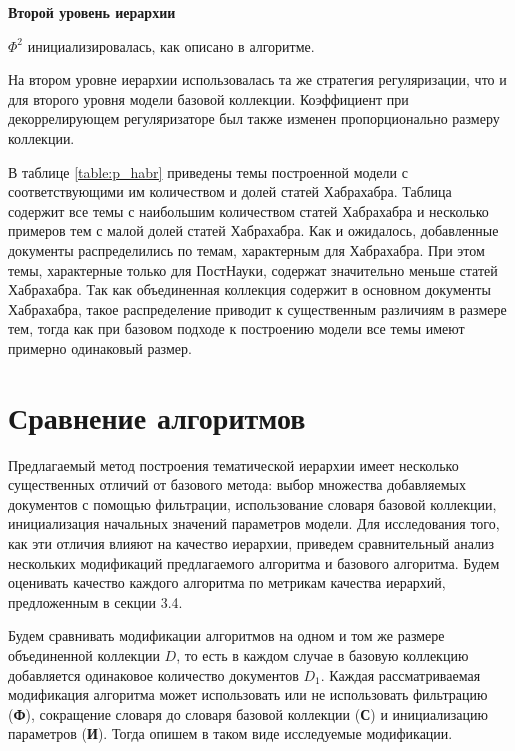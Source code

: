 \textbf{Второй уровень иерархии} 

$\Phi^2$ инициализировалась, как описано в алгоритме.

На втором уровне иерархии использовалась та же стратегия регуляризации, что и для второго уровня модели базовой коллекции. Коэффициент при декоррелирующем регуляризаторе был также изменен пропорционально размеру коллекции. 

В таблице \ref{table:p_habr} приведены темы построенной модели с соответствующими им количеством и долей статей Хабрахабра. Таблица содержит все темы с наибольшим количеством статей Хабрахабра и несколько примеров тем с малой долей статей Хабрахабра. Как и ожидалось, добавленные документы распределились по темам, характерным для Хабрахабра. При этом темы, характерные только для ПостНауки, содержат значительно меньше статей Хабрахабра. Так как объединенная коллекция содержит в основном документы Хабрахабра, такое распределение приводит к существенным различиям в размере тем, тогда как при базовом подходе к построению модели все темы имеют примерно одинаковый размер.

\section{Сравнение алгоритмов}

Предлагаемый метод построения тематической иерархии имеет несколько существенных отличий от базового метода: выбор множества добавляемых документов с помощью фильтрации, использование словаря базовой коллекции, инициализация начальных значений параметров модели. Для исследования того, как эти отличия влияют на качество иерархии, приведем сравнительный анализ нескольких модификаций предлагаемого алгоритма и базового алгоритма. Будем оценивать качество каждого алгоритма по метрикам качества иерархий, предложенным в секции 3.4.

Будем сравнивать модификации алгоритмов на одном и том же размере объединенной коллекции $D$, то есть в каждом случае в базовую коллекцию добавляется одинаковое количество документов $D_1$. Каждая рассматриваемая модификация алгоритма может использовать или не использовать фильтрацию (\textbf{Ф}), сокращение словаря до словаря базовой коллекции (\textbf{С}) и инициализацию параметров (\textbf{И}). Тогда опишем в таком виде исследуемые модификации.

